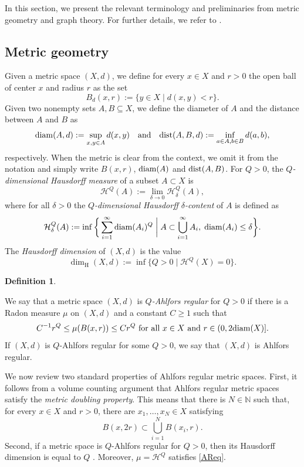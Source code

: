 \documentclass{amsart}
\newcommand{\diam}{{\rm diam}}
\newcommand{\dist}{{\rm dist}}
\numberwithin{equation}{section}
\theoremstyle{definition}
\newtheorem{definition}[equation]{Definition}
\theoremstyle{remark}
\newcommand{\N}{\mathbb{N}}
\newcommand{\cH}{\mathcal{H}}
\begin{document}
In this section, we present the relevant terminology and preliminaries from metric geometry and graph theory. For further details, we refer to \cite{He,bbi,MT,NakamuraYamasakiDuality}.



\subsection{Metric geometry}\label{Subsection: Conformal dimension}

Given a metric space \((X,d)\), we define for every \(x\in X\) and \(r>0\) the open ball of center \(x\) and radius \(r\) as the set
    \[
        B_d(x,r):=\{y\in X\mid d(x,y)<r\}.
    \]
Given two nonempty sets \(A,B\subseteq X\), we define the diameter of \(A\) and the distance between \(A\) and \(B\) as
    \[
        \diam(A,d):=\sup_{x,y\in A} d(x,y)
        \quad\text{and}\quad\dist(A,B,d):=\inf_{a\in A,b\in B} d(a,b),
    \]
respectively. When the metric is clear from the context, we omit it from the notation and simply write \(B(x,r)\), \(\diam(A)\) and \(\dist(A,B)\). For $Q > 0$, the  \emph{$Q$-dimensional Hausdorff measure} of a subset \(A\subset X\) is
\[
    \mathcal{H}^Q(A):=\lim_{\delta\to 0}\mathcal{H}_\delta^Q(A),
\]
where for all \(\delta>0\) the \emph{\(Q\)-dimensional Hausdorff \(\delta\)-content} of \(A\) is defined as
\[
    \mathcal{H}^Q_\delta(A):=\inf\bigg\{\sum_{i=1}^\infty \diam(A_i)^Q\; \bigg| \;A\subset\bigcup_{i=1}^\infty A_i,\;\diam(A_i)\leq\delta \bigg\}.
\]
The \emph{Hausdorff dimension} of \((X,d)\) is the value
    \[
        \dim_{\mathrm{H}}(X,d):=\inf\{ Q>0\mid \mathcal{H}^Q(X)=0\}.
    \] 

\begin{definition}\label{def:AR}


    We say that a metric space $(X,d)$ is \emph{\(Q\)-Ahlfors regular} for \(Q>0\) if there is a Radon measure \(\mu\) on $(X,d)$ and a constant $C \geq 1$ such that
    \begin{equation}\label{AReq}
    C^{-1} r^Q \leq \mu(B(x,r))\leq Cr^Q \text{ for all } x \in X \text{ and } r \in (0,2\diam(X)].
    \end{equation}
    If \((X,d)\) is \(Q\)-Ahlfors regular for some $Q > 0$, we say that $(X,d)$ is Ahlfors regular.
\end{definition}

We now review two standard properties of Ahlfors regular metric spaces. First, it follows from a volume counting argument that Ahlfors regular metric spaces satisfy the \emph{metric doubling property}. This means that there is $N \in \N$ such that, for every \(x\in X\) and \(r>0\), there are $x_1,\dots, x_N \in X$ satisfying
    \[
        B(x,2r)\subset\bigcup_{i=1}^N B(x_i,r).
    \]
Second, if a metric space is $Q$-Ahlfors regular for $Q > 0$, then its Hausdorff dimension is equal to $Q$ \cite[Pages 61-62]{He}. Moreover, $\mu=\cH^Q$ satisfies \eqref{AReq}.
\end{document}
